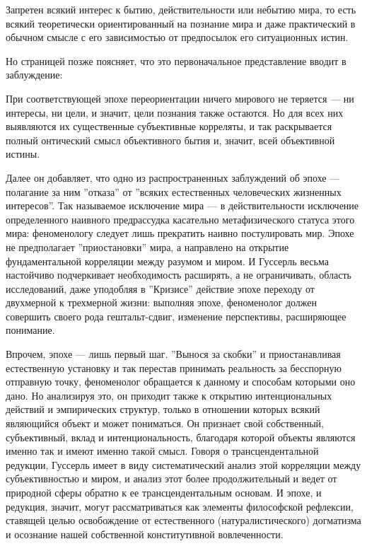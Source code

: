 \documentclass[11pt]{book}
\begin{document}
\smallskip
{}\relax
{}\relax

Запретен всякий интерес к бытию, действительности или небытию мира, то есть всякий теоретически ориентированный на познание мира и даже практический в обычном смысле с его зависимостью от предпосылок его ситуационных истин.

\relax
{}\relax
\smallskip

Но  страницей позже поясняет, что это первоначальное представление вводит в заблуждение:

\smallskip
{}\relax
{}\relax

При соответствующей эпохе переориентации ничего мирового не теряется --- ни интересы, ни цели, и значит, цели познания также остаются. Но для всех них выявляются их существенные субъективные корреляты, и так раскрывается полный онтический смысл объективного бытия и, значит, всей объективной истины.

\relax
{}\relax
\smallskip

Далее он добавляет, что одно из распространенных заблуждений об эпохе --- полагание за ним ''отказа'' от ''всяких естественных человеческих жизненных интересов''. Так называемое исключение мира --- в действительности исключение определенного наивного предрассудка касательно метафизического статуса этого мира: феноменологу следует лишь прекратить наивно постулировать мир. Эпохе не предполагает ''приостановки'' мира, а направлено на открытие фундаментальной корреляции между разумом и миром. И Гуссерль весьма настойчиво подчеркивает необходимость расширять, а не ограничивать, область исследований, даже уподобляя в ''Кризисе'' действие эпохе переходу от двухмерной к трехмерной жизни: выполняя эпохе, феноменолог должен совершить своего рода гештальт-сдвиг, изменение перспективы, расширяющее понимание.

Впрочем, эпохе --- лишь первый шаг. ''Вынося за скобки'' и приостанавливая естественную установку и так перестав принимать реальность за бесспорную отправную точку, феноменолог обращается к данному и способам которыми оно дано. Но анализируя это, он приходит также к открытию интенциональных действий и эмпирических структур, только в отношении которых всякий являющийся объект и может пониматься. Он признает свой собственный, субъективный, вклад и интенциональность, благодаря которой объекты являются именно так и имеют именно такой смысл. Говоря о трансцендентальной редукции, Гуссерль имеет в виду систематический анализ этой корреляции между субъективностью и миром, и анализ этот более продолжительный и ведет от природной сферы обратно к ее трансцендентальным основам. И эпохе, и редукция, значит, могут рассматриваться как элементы философской рефлексии, ставящей целью освобождение от естественного (натуралистического) догматизма и осознание нашей собственной конститутивной вовлеченности.
\end{document}
